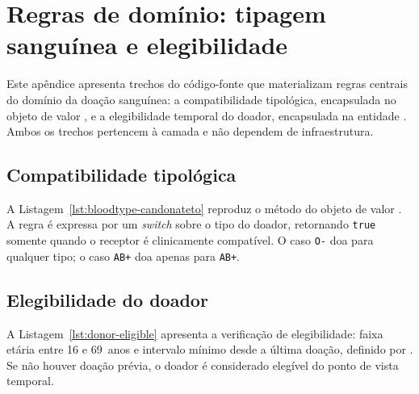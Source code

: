 \chapter{Regras de domínio: tipagem sanguínea e elegibilidade}
\label{ap:regras-dominio}

Este apêndice apresenta trechos do código-fonte que materializam regras centrais do domínio da doação sanguínea: a compatibilidade tipológica, encapsulada no objeto de valor , e a elegibilidade temporal do doador, encapsulada na entidade . Ambos os trechos pertencem à camada  e não dependem de infraestrutura.

\section{Compatibilidade tipológica}

A Listagem~\ref{lst:bloodtype-candonateto} reproduz o método  do objeto de valor . A regra é expressa por um \textit{switch} sobre o tipo do doador, retornando \texttt{true} somente quando o receptor é clinicamente compatível. O caso \texttt{O-} doa para qualquer tipo; o caso \texttt{AB+} doa apenas para \texttt{AB+}.



\section{Elegibilidade do doador}

A Listagem~\ref{lst:donor-eligible} apresenta a verificação de elegibilidade: faixa etária entre 16 e 69~anos e intervalo mínimo desde a última doação, definido por . Se não houver doação prévia, o doador é considerado elegível do ponto de vista temporal.



